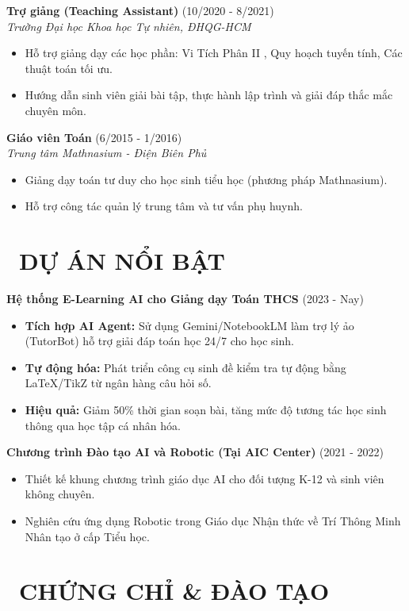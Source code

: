 \documentclass[11pt,a4paper]{article}
\begin{document}
\textbf{Trợ giảng (Teaching Assistant)} \hfill (10/2020 - 8/2021)\\
\textit{Trường Đại học Khoa học Tự nhiên, ĐHQG-HCM}
\begin{itemize}
    \item Hỗ trợ giảng dạy các học phần: Vi Tích Phân II , Quy hoạch tuyến tính, Các thuật toán tối ưu.
    \item Hướng dẫn sinh viên giải bài tập, thực hành lập trình và giải đáp thắc mắc chuyên môn.
\end{itemize}

\textbf{Giáo viên Toán} \hfill (6/2015 - 1/2016)\\
\textit{Trung tâm Mathnasium - Điện Biên Phủ}
\begin{itemize}
    \item Giảng dạy toán tư duy cho học sinh tiểu học (phương pháp Mathnasium).
    \item Hỗ trợ công tác quản lý trung tâm và tư vấn phụ huynh.
\end{itemize}

\section{\faRocket~DỰ ÁN NỔI BẬT}

\textbf{Hệ thống E-Learning AI cho Giảng dạy Toán THCS} \hfill (2023 - Nay)
\begin{itemize}
    \item \textbf{Tích hợp AI Agent:} Sử dụng Gemini/NotebookLM làm trợ lý ảo (TutorBot) hỗ trợ giải đáp toán học 24/7 cho học sinh.
    \item \textbf{Tự động hóa:} Phát triển công cụ sinh đề kiểm tra tự động bằng LaTeX/TikZ từ ngân hàng câu hỏi số.
    \item \textbf{Hiệu quả:} Giảm 50\% thời gian soạn bài, tăng mức độ tương tác học sinh thông qua học tập cá nhân hóa.
\end{itemize}

\textbf{Chương trình Đào tạo AI và Robotic (Tại AIC Center)} \hfill (2021 - 2022)
\begin{itemize}
    \item Thiết kế khung chương trình giáo dục AI cho đối tượng K-12 và sinh viên không chuyên.
    \item Nghiên cứu ứng dụng Robotic trong Giáo dục Nhận thức về Trí Thông Minh Nhân tạo ở cấp Tiểu học.
\end{itemize}

\section{\faCertificate~CHỨNG CHỈ \& ĐÀO TẠO}
\end{document}
